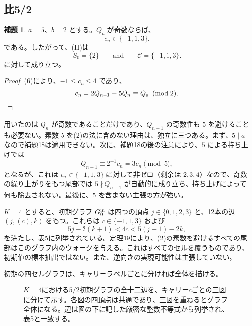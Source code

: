 \documentclass[11pt,reqno]{amsart}
\theoremstyle{definition}
\newtheorem{lemma}[theorem]{補題}
\theoremstyle{definition}
\theoremstyle{remark}
\begin{document}
\subsection{比5/2}\label{sec:5.3}

\begin{samepage}
\begin{lemma}\leavevmode\label{thm:24}
\(a=5\)、\(b=2\) とする。\(Q_n\) が奇数ならば、
\[
c_n\in\{-1,1,3\}.
\]
である。したがって、(H)は
\[
S_0=\{2\}\qquad \text{and}\qquad \mathcal C=\{-1,1,3\}.
\]
に対して成り立つ。
\label{thm-end:24}
\end{lemma}
\end{samepage}

\begin{proof}\leavevmode\label{proof:24}
(6)により、\(-1\le c_n\le4\) であり、
\[
c_n=2Q_{n+1}-5Q_n\equiv Q_n\pmod2.\qedhere
\]
\end{proof}

用いたのは \(Q_n\) が奇数であることだけであり、\(Q_{n+1}\) の奇数性も \(5\) を避けることも必要ない。素数 \(5\) を(2)の法に含めない理由は、独立に三つある。まず、\(5\mid a\) なので補題18は適用できない。次に、補題18の後の注意により、\(5\) による持ち上げでは
\[
Q_{n+1}\equiv2^{-1}c_n=3c_n\pmod5,
\]
となるが、これは \(c_n\in\{-1,1,3\}\) に対して非ゼロ（剰余は \(2,3,4\)）なので、奇数の繰り上がりをもつ尾部では \(5\nmid Q_{n+1}\) が自動的に成り立ち、持ち上げによって何も除去されない。最後に、\(5\) を含まない主張の方が強い。

\(K=4\) とすると、初期グラフ \(G_0^{\rm in}\) は四つの頂点 \(j\in\{0,1,2,3\}\) と、12本の辺 \((j,(c),k)\) をもつ。これらは \(c\in\{-1,1,3\}\) および
\[
5j-2(k+1)<4c<5(j+1)-2k,
\]
を満たし、表5に列挙されている。定理19により、(2)の素数を避けるすべての尾部はこのグラフ内のウォークを与える。これはすべてのセルを覆うものであり、初期値の標本抽出ではない。また、逆向きの実現可能性は主張していない。

初期の四セルグラフは、キャリーラベルごとに分ければ全体を描ける。

\begin{figure}[htbp]
\centering

\caption{\(K=4\)における\(5/2\)初期グラフの全十二辺を、キャリー\(c\)ごとの三図に分けて示す。各図の四頂点は共通であり、三図を重ねるとグラフ全体になる。辺は図の下に記した厳密な整数不等式から列挙され、表5と一致する。}
\label{fig:initial-graph}
\end{figure}
\end{document}

